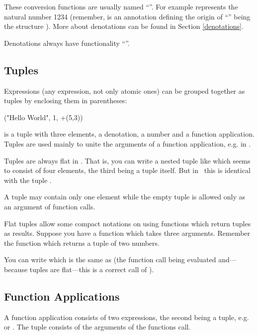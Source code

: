 These conversion functions are usually named ``\pro{!}''.
For example  represents the natural number 1234
(remember,   is an annotation defining the origin of
``\pro{!}'' being the structure ).
More about denotations can be found in Section \ref{denotations}.

Denotations always have functionality ``''.

\subsection{Tuples}
\label{sec:tuples}
\novice
Expressions (any expression, not only atomic ones) can be grouped
together as tuples by enclosing them in parentheses:
\begin{prog}
        ("Hello World", 1, +(5,3))
\end{prog}

\noindent is a tuple with three elements, a denotation, a number and a function
application.
Tuples are used mainly to unite the arguments of a function
application, e.g. in .

Tuples are always flat in \opal.
That is, you can write a nested tuple like  which
seems to consist of four elements, the third being a tuple itself.
But in \opal\ this is identical with the tuple .

A tuple may contain only one element while the empty tuple is allowed
only as an argument of function calls.

\advanced  Flat tuples allow some compact notations on using
functions which return tuples as results. 
Suppose you have a function  
which takes three arguments.
Remember the function  which
returns a tuple of two numbers.

You can write  which is the same as
 (the function call  being
evaluated and---because tuples are flat---this is a correct call of 
). 


\subsection{Function Applications}
\label{subsec:func.appl}
\novice
A function application consists of two expressions, the second being
a tuple, e.g.~ or .
The tuple consists of the arguments of the functions call.

